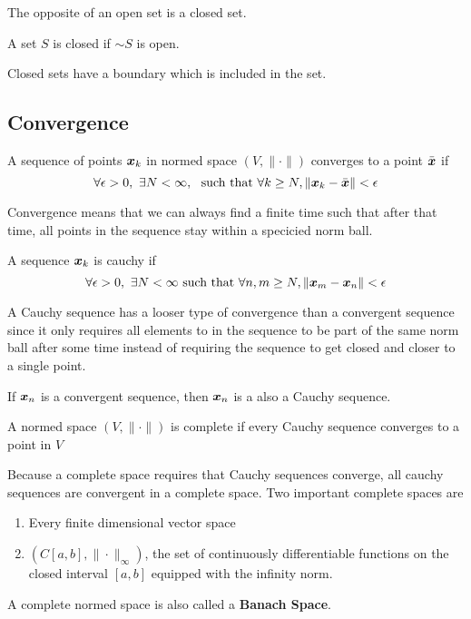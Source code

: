 The opposite of an open set is a closed set.
\begin{definition}
	A set $S$ is closed if $\sim S$ is open.
	\label{defn:closed-set}
\end{definition}
Closed sets have a boundary which is included in the set.

\subsection{Convergence}
\begin{definition}
	A sequence of points $\boldsymbol{x}_k$ in normed space $(V, \|\cdot\|)$ converges to
	a point $\bar{\boldsymbol{x}}$ if \[
		\forall \epsilon > 0,\ \exists N < \infty,\ \text{ such that } \forall k
		\geq N, \|\boldsymbol{x}_k - \bar{\boldsymbol{x}}\| < \epsilon
	\]
	\label{defn:convergence}
\end{definition}
Convergence means that we can always find a finite time such that after that
time, all points in the sequence stay within a specicied norm ball.
\begin{definition}
	A sequence $\boldsymbol{x}_k$ is cauchy if \[
		\forall \epsilon > 0,\ \exists N < \infty \text{ such that } \forall n,m
		\geq N, \|\boldsymbol{x}_m - \boldsymbol{x}_n\| < \epsilon
	\]
	\label{defn:cauchy-sequence}
\end{definition}
A Cauchy sequence has a looser type of convergence than a convergent sequence
since it only requires all elements to in the sequence to be part of the same
norm ball after some time instead of requiring the sequence to get closed and
closer to a single point.
\begin{theorem}
	If $\boldsymbol{x}_n$ is a convergent sequence, then $\boldsymbol{x}_n$ is a also a Cauchy
	sequence.
	\label{thm:cauchy-convergence}
\end{theorem}
\begin{definition}
	A normed space $(V, \|\cdot\|)$ is complete if every Cauchy sequence converges
	to a point in $V$
	\label{defn:complete-space}
\end{definition}
Because a complete space requires that Cauchy sequences converge, all cauchy
sequences are convergent in a complete space. Two important complete spaces are
\begin{enumerate}
	\item Every finite dimensional vector space
	\item $(C[a,b], \|\cdot\|_\infty)$, the set of continuously differentiable
		functions on the closed interval $[a,b]$ equipped with the infinity norm.
\end{enumerate}
A complete normed space is also called a \textbf{Banach Space}.

